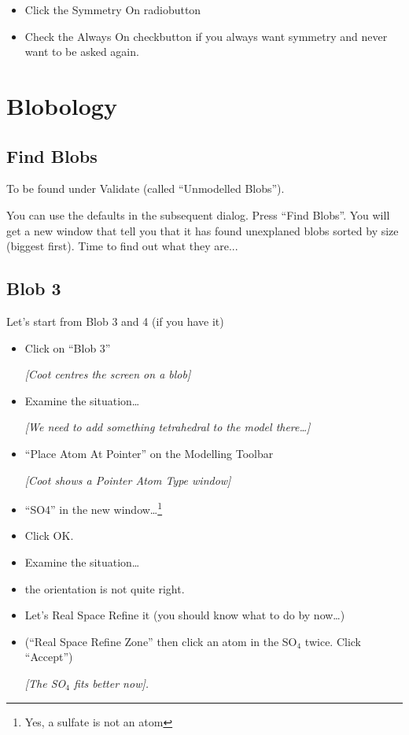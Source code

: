 \documentclass{article}
\begin{document}
\begin{itemize}

\item
  Click the \textsf{Symmetry On} radiobutton


\item
  Check the \textsf{Always On} checkbutton if you always want symmetry and never
  want to be asked again.
\end{itemize}


\section{Blobology}

\subsection{Find Blobs}
To be found under Validate (called ``Unmodelled Blobs'').


You can use the defaults in the subsequent dialog. Press ``Find Blobs''.
You will get a new window that tell you that it has found unexplaned
blobs sorted by size (biggest first).  Time to find out what they are...

\subsection{Blob 3}
Let's start from Blob 3 and 4 (if you have it)

\begin{itemize}
\item Click on ``Blob 3''

\textsl{ [\emph{Coot} centres the screen on a blob]}

\item Examine the situation\ldots

  \emph{[We need to add something tetrahedral to the model there\ldots]}

\item \textsf{``Place Atom At Pointer''} on the Modelling Toolbar

\textsl{ [\emph{Coot} shows a Pointer Atom Type window]}

\item \textsf{``SO4''} in the new window\ldots\footnote{Yes, a sulfate is not an atom}
\item Click \textsf{OK}.
\item Examine the situation\ldots
\item the orientation is not quite right.
\item Let's Real Space Refine it (you should know what to do by now\ldots)
\item (\textsf{``Real Space Refine Zone''} then click an atom in the
  SO$_4$ twice.  Click ``Accept'')

\textsl{[The SO$_4$ fits better now].}

\end{itemize}
\end{document}
